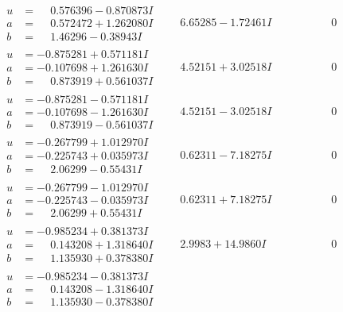 \documentclass[1p]{elsarticle_modified}
\theoremstyle{definition}
\begin{document}
$$\begin{array}{c|c|c}
\begin{aligned}
u &= \phantom{-}0.576396 - 0.870873 I \\
a &= \phantom{-}0.572472 + 1.262080 I \\
b &= \phantom{-}1.46296 - 0.38943 I\end{aligned}
 & \phantom{-}6.65285 - 1.72461 I & \phantom{-0.000000 } 0 \\ \hline\begin{aligned}
u &= -0.875281 + 0.571181 I \\
a &= -0.107698 + 1.261630 I \\
b &= \phantom{-}0.873919 + 0.561037 I\end{aligned}
 & \phantom{-}4.52151 + 3.02518 I & \phantom{-0.000000 } 0 \\ \hline\begin{aligned}
u &= -0.875281 - 0.571181 I \\
a &= -0.107698 - 1.261630 I \\
b &= \phantom{-}0.873919 - 0.561037 I\end{aligned}
 & \phantom{-}4.52151 - 3.02518 I & \phantom{-0.000000 } 0 \\ \hline\begin{aligned}
u &= -0.267799 + 1.012970 I \\
a &= -0.225743 + 0.035973 I \\
b &= \phantom{-}2.06299 - 0.55431 I\end{aligned}
 & \phantom{-}0.62311 - 7.18275 I & \phantom{-0.000000 } 0 \\ \hline\begin{aligned}
u &= -0.267799 - 1.012970 I \\
a &= -0.225743 - 0.035973 I \\
b &= \phantom{-}2.06299 + 0.55431 I\end{aligned}
 & \phantom{-}0.62311 + 7.18275 I & \phantom{-0.000000 } 0 \\ \hline\begin{aligned}
u &= -0.985234 + 0.381373 I \\
a &= \phantom{-}0.143208 + 1.318640 I \\
b &= \phantom{-}1.135930 + 0.378380 I\end{aligned}
 & \phantom{-}2.9983 + 14.9860 I & \phantom{-0.000000 } 0 \\ \hline\begin{aligned}
u &= -0.985234 - 0.381373 I \\
a &= \phantom{-}0.143208 - 1.318640 I \\
b &= \phantom{-}1.135930 - 0.378380 I\end{aligned}

\end{array}$$
\end{document}
